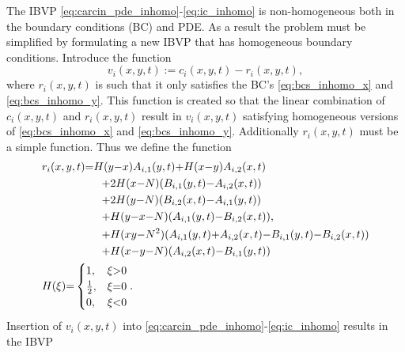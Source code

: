\documentclass[\main/thesis.tex]{subfiles}
\begin{document}
The IBVP \eqref{eq:carcin_pde_inhomo}-\eqref{eq:ic_inhomo} is non-homogeneous both in the boundary conditions (BC) and PDE. As a result the problem must be simplified by formulating a new IBVP that 
has homogeneous boundary conditions. Introduce the function
\begin{equation*}
v_i(x, y, t) {:=} c_i(x, y, t) {-} r_i(x, y, t),
\end{equation*}
where $r_i(x, y, t)$ is such that it only satisfies the BC's \eqref{eq:bcs_inhomo_x} and \eqref{eq:bcs_inhomo_y}. This function is created so that the linear combination of $c_i(x, y, t)$ and 
$r_i(x, y, t)$ result in $v_i(x, y, t)$ satisfying homogeneous versions of \eqref{eq:bcs_inhomo_x} and \eqref{eq:bcs_inhomo_y}. Additionally $r_i(x, y, t)$ must be a simple function.
Thus we define the function
\begin{align}
&r_i(x, y, t) {=} H(y{-}x)A_{i, 1}(y, t) {+} H(x{-}y)A_{i, 2}(x, t) \nonumber\\
&\hspace{0.75in}{+} 2H(x{-}N)(B_{i, 1}(y, t) {-} A_{i, 2}(x, t)) \nonumber\\
&\hspace{0.75in}{+} 2H(y{-}N)(B_{i, 2}(x, t) {-} A_{i, 1}(y, t)) \nonumber\\
&\hspace{0.75in}{+} H(y{-}x{-}N)(A_{i, 1}(y, t) {-} B_{i, 2}(x, t)), \nonumber\\
&\hspace{0.75in}{+} H(xy{-}N^2)(A_{i, 1}(y, t) {+} A_{i, 2}(x, t) {-} B_{i, 1}(y, t) {-} B_{i, 2}(x, t)) \nonumber\\
&\hspace{0.75in}{+} H(x{-}y{-}N)(A_{i, 2}(x, t) {-} B_{i, 1}(y, t)) \label{eq:ref_carcin_concen}\\
&H(\xi) {=} \begin{cases}
	1, &\xi {>} 0 \\
	\frac{1}{2}, &\xi {=} 0 \\
	0, &\xi {<} 0
\end{cases}.
\label{eq:heaviside}
\end{align}
Insertion of $v_i(x, y, t)$ into \eqref{eq:carcin_pde_inhomo}-\eqref{eq:ic_inhomo} results in the IBVP
\end{document}
